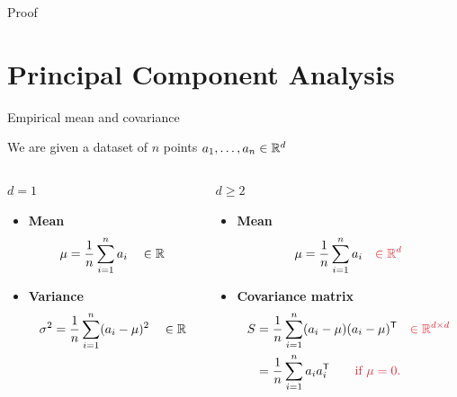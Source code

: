 \documentclass{beamer}
\begin{document}
\begin{frame}[t]{Proof}
	\grid

	\pause
	\pause
\end{frame}

\section{Principal Component Analysis}
\begin{frame}[t]{Empirical mean and covariance}
	\grid

	We are given a dataset of $n$ points $a_1, \dots, a_n \in \mathbb{R}^d$
	\vspace*{0.4cm}
	\begin{columns}
		\hspace*{-0.6cm}
		\begin{column}{0.45\textwidth}
			\vspace*{-1.7cm}
			\begin{center}
				\underline{$d=1$}
			\end{center}

			\begin{itemize}
				\item \textbf{Mean}
					$$
					\mu = \frac{1}{n}\sum_{i=1}^n a_i \quad \in \mathbb{R}
					$$
				\item \textbf{Variance}
					$$
					\sigma^2 = \frac{1}{n} \sum_{i=1}^n (a_i - \mu)^2 \quad \in \mathbb{R}
					$$
			\end{itemize}
		\end{column}
		\vrule
		\begin{column}{0.5\textwidth}
			\vspace*{-0.5cm}
			\pause
			\begin{center}
				\underline{$d \geq 2$}
			\end{center}
			\begin{itemize}
				\item \textbf{Mean}
					$$
					\mu = \frac{1}{n}\sum_{i=1}^n a_i \quad {\color{ExecusharesRed} \in \R^d}
					$$
				\item \textbf{Covariance matrix}
					\begin{align*}
						S &= \frac{1}{n} \sum_{i=1}^n (a_i - \mu)(a_i - \mu)^{\sT} \quad {\color{ExecusharesRed} \in \R^{d \times d}}
						\\
						  &= \frac{1}{n} \sum_{i=1}^n a_i a_i ^{\sT} \qquad {\color{ExecusharesRed} \text{if  } \mu=0.}
					\end{align*}
			\end{itemize}
		\end{column}
	\end{columns}
\end{frame}
\end{document}
